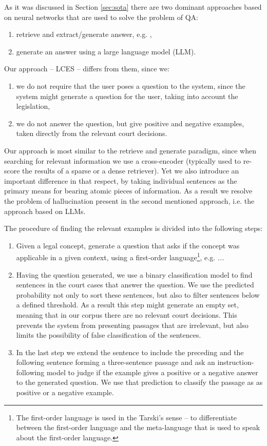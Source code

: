 As it was discussed in Section \ref{sec:sota} there are two dominant approaches 
based on neural networks that are used to solve the problem of QA:
\begin{enumerate}
  \item retrieve and extract/generate answer, e.g. , %
  \item generate an answer using a large language model (LLM). %
\end{enumerate}

Our approach -- LCES -- differs from them, since we:
\begin{enumerate}
  \item we do not require that the user poses a question to the system, since the system might generate a question for the user,
    taking into account the legislation,
  \item we do not answer the question, but give positive and negative examples, taken directly from the relevant court decisions.
\end{enumerate}
Our approach is most similar to the retrieve and generate paradigm, since when searching for relevant information we use
a cross-encoder (typically used to re-score the results of a sparse or a dense retriever). Yet we also introduce an important
difference in that respect, by taking individual sentences as the primary means for bearing atomic pieces of information.  
As a result we resolve the problem of hallucination present in the second mentioned approach, i.e. the approach based on LLMs.

The procedure of finding the relevant examples is divided into the following steps:
\begin{enumerate}
  \item Given a legal concept, generate a question that asks if the concept was applicable in a given context,
    using a first-order language\footnote{The first-order language is used in the Tarski's sense -- to differentiate
    between the first-order language and the meta-language that is used to speak about the first-order language.}, e.g. 
    \textit{...} %
  \item Having the question generated, we use a binary classification model to find sentences in the court cases that answer the question. 
    We use the predicted probability not only to sort these sentences, but also to filter sentences below a defined threshold.
    As a result this step might generate an empty set, meaning that in our corpus there are no relevant court decisions. 
    This prevents the system from presenting passages that are irrelevant, but also limits the possibility of false
    classification of the sentences.
  \item In the last step we extend the sentence to include the preceding and the following sentence forming a three-sentence passage
    and ask an instruction-following model to judge if the example gives a positive or a negative answer to the generated question.
    We use that prediction to classify the passage as as positive or a negative example.
\end{enumerate}

